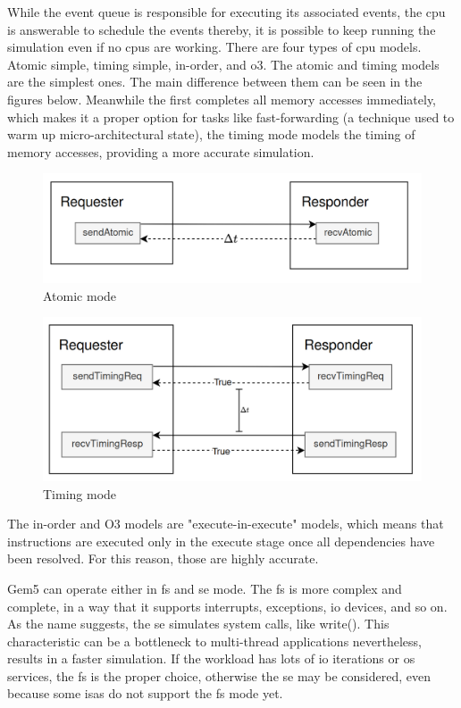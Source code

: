 While the event queue is responsible for executing its associated events, the \gls{cpu} is answerable to schedule the events thereby, it is 
possible to keep running the simulation even if no \glspl{cpu} are working. There are four types of \gls{cpu} models. Atomic simple, timing 
simple, in-order, and \gls{o3}. The atomic and timing models are the simplest ones. The main difference between them can be seen in 
the figures below. Meanwhile the first completes all memory accesses immediately, which makes it a proper option for tasks like 
fast-forwarding (a technique used to warm up micro-architectural state), the timing mode models the timing of memory accesses, providing a more 
accurate simulation.

\begin{figure}[H]
	\centering
 	\includegraphics[width=0.7\linewidth]{Images/AtomicMode.png}
 	\caption{Atomic mode}
	 \label{fig_AtomicMode}
\end{figure}

\begin{figure}[H]
	\centering
 	\includegraphics[width=0.7\linewidth]{Images/TimingMode.png}
 	\caption{Timing mode}
	 \label{fig_TimingMode}
\end{figure}

The in-order and O3 models are "execute-in-execute" models, which means that instructions are executed only in the execute stage once all 
dependencies have been resolved. For this reason, those are highly accurate.

Gem5 can operate either in \gls{fs} and \gls{se} mode. The \gls{fs} is more complex and complete, in a way that it supports interrupts, 
exceptions, \gls{io} devices, and so on. As the name suggests, the \gls{se} simulates system calls, like write(). This characteristic can 
be a bottleneck to multi-thread applications nevertheless, results in a faster simulation. If the workload has lots of \gls{io} iterations or 
\gls{os} services, the \gls{fs} is the proper choice, otherwise the \gls{se} may be considered, even because some \glspl{isa} do not support 
the \gls{fs} mode yet. 

